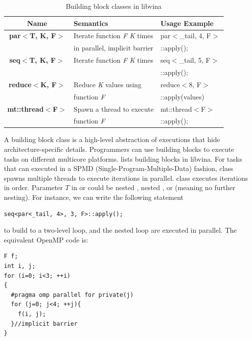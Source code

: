 \begin{table}[hbt]
\caption{Building block classes in libvina}
\begin{tabular}{|c|l|l|}
\hline
Name& Semantics& Usage Example\\
\hline
\textbf{par$<$T, K, F$>$}& Iterate function \textit{F} \textit{K} times &par$<$\_tail, 4, F$>$\\ 
                         &in parallel, implicit barrier                 &::apply();\\                
\hline
\textbf{seq$<$T, K, F$>$}& Iterate function \textit{F} \textit{K} times&seq$<$\_tail, 5, F$>$\\
                         &                                             &::apply();\\
\hline
\textbf{reduce$<$K, F$>$}&Reduce \textit{K} values using &reduce$<$8, F$>$\\
&function
\textit{F}&::apply(values)\\
\hline
\textbf{mt::thread$<$F$>$}&Spawn a thread to execute  & mt::thread$<$F$>$\\
                          &function \textit{F}        & ::apply();\\
\hline
\end{tabular}\label{tbl:bb}
\end{table}

A building block class is a high-level abstraction of executions that
hide architecture-specific details. Programmers can use building blocks to
execute tasks on different multicore platforms.
 lists building blocks in libvina. For tasks that can
executed in a SPMD (Single-Program-Multiple-Data) fashion,  class spawns
multiple threads to execute iterations in parallel.  class 
executes iterations in order. Parameter $T$ in  or  could be nested
, nested , or  (meaning no further nesting).
For instance, we can write the following statement 


\begin{lstlisting}
seq<par<_tail, 4>, 3, F>::apply();
\end{lstlisting}
to build to a two-level loop, and the nested loop are executed in
parallel. The equivalent OpenMP code is:
\begin{lstlisting}
F f;
int i, j;
for (i=0; i<3; ++i)
{
  #pragma omp parallel for private(j)
  for (j=0; j<4; ++j){ 
    f(i, j);
  }//implicit barrier
}
\end{lstlisting}

